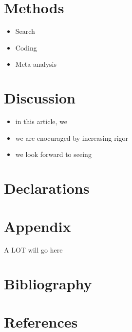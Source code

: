\documentclass[sn-nature,pdflatex]{sn-jnl}
\providecommand{\tightlist}{%
  \setlength{\itemsep}{0pt}\setlength{\parskip}{0pt}}
\begin{document}
\section{Methods}\label{sec3}

\begin{itemize}
\tightlist
\item
  Search
\item
  Coding
\item
  Meta-analysis
\end{itemize}

\section{Discussion}\label{sec4}

\begin{itemize}
\tightlist
\item
  in this article, we
\item
  we are enocuraged by increasing rigor
\item
  we look forward to seeing
\end{itemize}

\backmatter



\section*{Declarations}\label{declarations}

\section{Appendix}\label{secA1}

A LOT will go here

\section{Bibliography}\label{bibliography}

\section{References}\label{references}

\printbibliography


\end{document}

